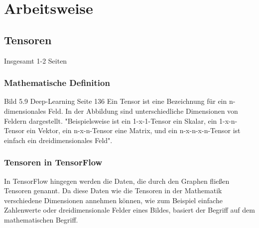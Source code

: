 \chapter{Arbeitsweise}
\label{chap:arbeitsweise}
\section{Tensoren}
\label{sec:tensoren}
\printsubchapterauthor{\authorNiklas}
Insgesamt 1-2 Seiten

\subsection{Mathematische Definition}
\label{sec:mathematischeDefinition}
Bild 5.9 Deep-Learning Seite 136
Ein Tensor ist eine Bezeichnung für ein n-dimensionales Feld. In der Abbildung sind unterschiedliche Dimensionen von Feldern dargestellt. "Beispielsweise ist ein 1-x-1-Tensor ein Skalar, ein 1-x-n-Tensor ein Vektor, ein n-x-n-Tensor eine Matrix, und ein n-x-n-x-n-Tensor ist einfach ein dreidimensionales Feld"\citep{Einfuehrung}.

\subsection{Tensoren in TensorFlow}
\label{sec:tensorenInTensorflow}
In TensorFlow hingegen werden die Daten, die durch den Graphen fließen Tensoren genannt. Da diese Daten wie die Tensoren in der Mathematik verschiedene Dimensionen annehmen können, wie zum Beispiel einfache Zahlenwerte oder dreidimensionale Felder eines Bildes, basiert der Begriff auf dem mathematischen Begriff. 

